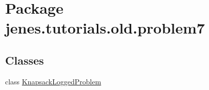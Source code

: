 \hypertarget{namespacejenes_1_1tutorials_1_1old_1_1problem7}{\section{Package jenes.\-tutorials.\-old.\-problem7}
\label{namespacejenes_1_1tutorials_1_1old_1_1problem7}
}
\subsection*{Classes}
\begin{DoxyCompactItemize}
\item 
class \hyperlink{classjenes_1_1tutorials_1_1old_1_1problem7_1_1_knapsack_logged_problem}{Knapsack\-Logged\-Problem}
\end{DoxyCompactItemize}
